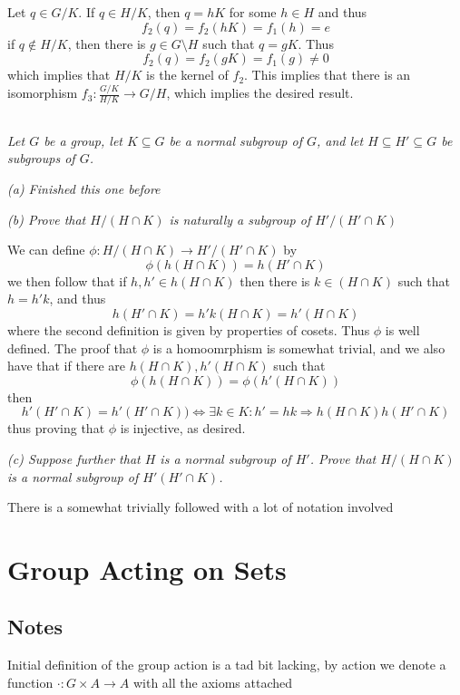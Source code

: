 \documentclass[11pt,oneside,titlepage]{book}
\DeclareMathOperator \lra {\Leftrightarrow}
\DeclareMathOperator \ra {\Rightarrow}
\begin{document}
Let $q \in G/K$.  If $q \in H/K$, then $q = hK$ for some $h \in H$ and
thus
$$f_2(q) = f_2(hK) = f_1(h) = e$$
if $q \notin H/K$, then there is $g \in G \setminus H$ such that $q =
gK$. Thus
$$f_2(q) = f_2(gK) = f_1(g) \neq 0$$
which implies that $H/K$ is the kernel of $f_2$. This implies that
there is an isomorphism $f_3: \frac{G/K}{H/K} \to G/H$, which implies
the desired result.

\subsection{}

\textit{Let $G$ be a group, let $K \subseteq G$ be a normal subgroup
of $G$, and let $H \subseteq H' \subseteq G$ be subgroups of $G$.}

\textit{(a) Finished this one before}

\textit{(b) Prove that $H/(H \cap K)$ is naturally a subgroup of
$H'/(H' \cap K)$}

We can define $\phi: H/(H \cap K) \to H'/(H' \cap K)$ by
$$\phi(h(H \cap K)) = h(H' \cap K)$$
we then follow that if $h, h' \in h(H \cap K)$ then there is $k \in (H
\cap K)$ such that $h = h'k$, and thus
$$h(H' \cap K) = h'k(H \cap K) = h'(H \cap K)$$
where the second definition is given by properties of cosets. Thus
$\phi$ is well defined. The proof that $\phi$ is a homoomrphism is
somewhat trivial, and we also have that if there are $h(H \cap K),
h'(H \cap K)$ such that
$$\phi(h(H \cap K)) = \phi(h'(H \cap K))$$
then
$$h'(H' \cap K) = h'(H' \cap K)) \lra
\exists k \in K: h' = hk \ra h(H \cap K) h(H' \cap K)$$ thus proving
that $\phi$ is injective, as desired.

\textit{(c) Suppose further that $H$ is a normal subgroup of
$H'$. Prove that $H/(H \cap K)$ is a normal subgroup of $H'(H' \cap
K)$.}

There is a somewhat trivially followed with a lot of notation involved

\section{Group Acting on Sets}

\subsection*{Notes}

Initial definition of the group action is a tad bit lacking, by action
we denote a function $\cdot: G \times A \to A$ with all the axioms
attached
\end{document}
